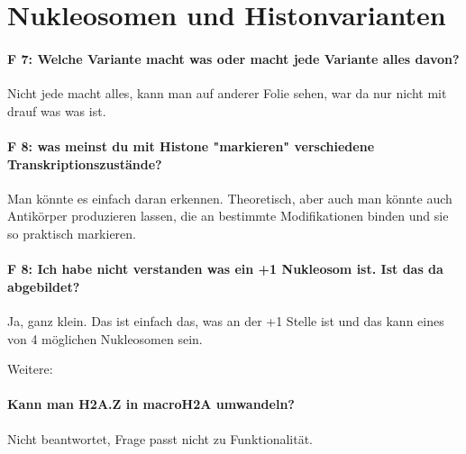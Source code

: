 
\section{Nukleosomen und Histonvarianten}\label{sec:nukleosomen-und-histonvarianten}



\paragraph{F 7: Welche Variante macht was oder macht jede Variante alles davon?}  Nicht jede macht alles, kann man
auf anderer Folie sehen, war da nur nicht mit drauf was was ist.

\paragraph{F 8: was meinst du mit Histone "markieren" verschiedene Transkriptionszustände?} Man könnte es einfach
daran erkennen.
Theoretisch, aber auch man könnte auch Antikörper produzieren lassen, die an bestimmte
Modifikationen binden und sie so praktisch markieren.

\paragraph{F 8: Ich habe nicht verstanden was ein +1 Nukleosom ist. Ist das da abgebildet?} Ja, ganz klein.
Das ist einfach das, was an der +1 Stelle ist und das kann eines von 4 möglichen Nukleosomen sein.


Weitere:
\paragraph{Kann man H2A.Z in macroH2A umwandeln?} Nicht beantwortet, Frage passt nicht zu Funktionalität.

